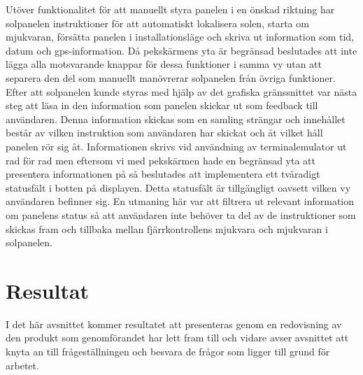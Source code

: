 \documentclass{article}
\begin{document}
            \noindent Utöver funktionalitet för att manuellt styra panelen i en önskad riktning har solpanelen instruktioner för att automatiskt lokalisera solen, starta om mjukvaran, försätta panelen i installationsläge och skriva ut information som tid, datum och gps-information. Då pekskärmens yta är begränsad beslutades att inte lägga alla motsvarande knappar för dessa funktioner i samma vy utan att separera den del som manuellt manövrerar solpanelen från övriga funktioner.\\

            \noindent Efter att solpanelen kunde styras med hjälp av det grafiska gränssnittet var nästa steg att läsa in den information som panelen skickar ut som feedback till användaren. Denna information skickas som  en samling strängar och innehållet består av vilken instruktion som användaren har skickat och åt vilket håll panelen rör sig åt. 
            Informationen skrivs vid användning av terminalemulator ut rad för rad men eftersom vi med pekskärmen hade en begränsad yta att presentera informationen på så beslutades att implementera ett tvåradigt statusfält i botten på displayen. Detta statusfält är tillgängligt oavsett vilken vy användaren befinner sig.
            En utmaning här var att filtrera ut relevant information om panelens status så att användaren inte behöver ta del av de instruktioner som skickas fram och tillbaka mellan fjärrkontrollens mjukvara och mjukvaran i solpanelen. \\





    \newpage

    \section{Resultat} %
    \label{sec:resultat}
        I det här avsnittet kommer resultatet att presenteras genom en redovisning av den produkt som genomförandet har lett fram till och 
        vidare avser avsnittet att knyta an till frågeställningen och besvara de frågor som ligger till grund för arbetet. \\
\end{document}
